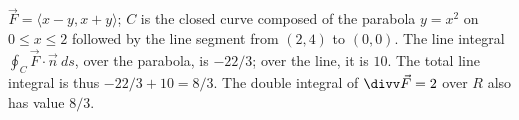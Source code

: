 {$\vec F = \langle x-y,x+y\rangle$; $C$ is the closed curve composed of the parabola $y=x^2$ on $0\leq x\leq 2$ followed by the line segment from $(2,4)$ to $(0,0)$.
}
{The line integral $\oint_C\vec F\cdot \vec n\ ds$, over the parabola, is $-22/3$; over the line, it is $10$. The total line integral is thus $-22/3+10 = 8/3$. The double integral of $\divv \vec F = 2$ over $R$ also has value $8/3$.
}

